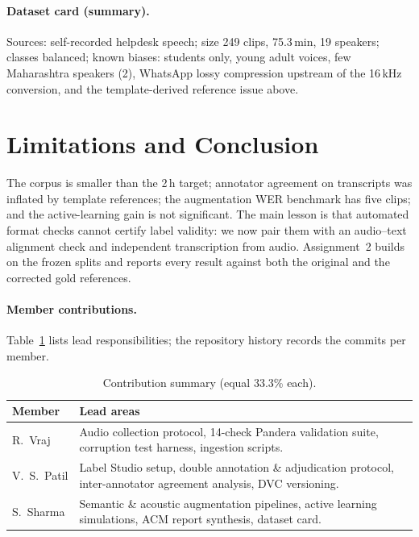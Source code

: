 \documentclass[sigconf,authordraft]{acmart}
\begin{document}
\paragraph{Dataset card (summary).} Sources: self-recorded helpdesk speech; size 249 clips, 75.3\,min, 19 speakers; classes balanced; known biases: students only, young adult voices, few Maharashtra speakers (2), WhatsApp lossy compression upstream of the 16\,kHz conversion, and the template-derived reference issue above.

\section{Limitations and Conclusion}\label{sec:concl}
The corpus is smaller than the 2\,h target; annotator agreement on transcripts was inflated by template references; the augmentation WER benchmark has five clips; and the active-learning gain is not significant. The main lesson is that automated format checks cannot certify label validity: we now pair them with an audio--text alignment check and independent transcription from audio.
Assignment~2 builds on the frozen splits and reports every result against both the original and the corrected gold references.

\paragraph{Member contributions.}\label{sec:contrib}
Table~\ref{tab:contrib} lists lead responsibilities; the repository history records the commits per member.
\begin{table}[htbp]
\caption{Contribution summary (equal 33.3\% each).}\label{tab:contrib}
\begin{tabular}{p{1.2cm}p{5.8cm}}
\toprule Member & Lead areas \\ \midrule
R.\ Vraj & Audio collection protocol, 14-check Pandera validation suite, corruption test harness, ingestion scripts. \\
V.\ S.\ Patil & Label Studio setup, double annotation \& adjudication protocol, inter-annotator agreement analysis, DVC versioning. \\
S.\ Sharma & Semantic \& acoustic augmentation pipelines, active learning simulations, ACM report synthesis, dataset card. \\ \bottomrule
\end{tabular}
\end{table}
\end{document}

